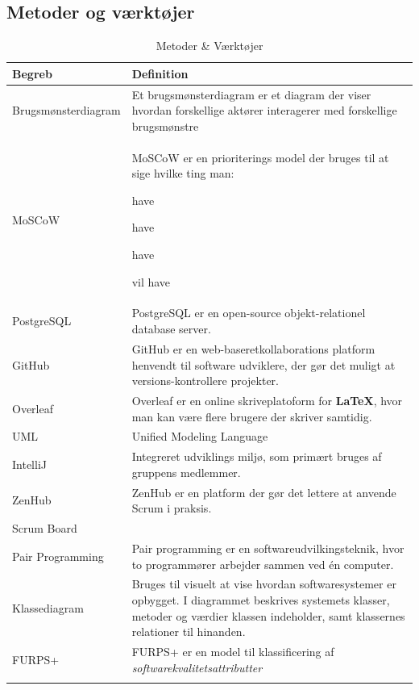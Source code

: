 \subsection{Metoder og værktøjer}
\begin{longtable}{|p{4cm}|p{12cm}|}
\hline
\textbf{Begreb} & \textbf{Definition} \\
\hline
Brugsmønsterdiagram & Et brugsmønsterdiagram er et diagram der viser hvordan forskellige aktører interagerer med forskellige brugsmønstre \\
\hline
MoSCoW & 
MoSCoW er en prioriterings model der bruges til at sige hvilke ting man: 
\begin{description}[noitemsep]
    \item [Skal] have
    \item [Burde] have 
    \item [Kan] have
    \item [Hvad man ikke] vil have
\end{description}  \\ 
\hline
PostgreSQL          &   PostgreSQL er en open-source objekt-relationel database server.\\
\hline
GitHub              &   GitHub er en web-baseretkollaborations platform henvendt til software udviklere, der gør det muligt at versions-kontrollere projekter.\\ 
\hline
Overleaf            &   Overleaf er en online skriveplatoform for \textbf{LaTeX}, hvor man kan være flere brugere der skriver samtidig. \\
\hline
UML                 &   Unified Modeling Language \\
\hline
IntelliJ            &   Integreret udviklings miljø, som primært bruges af gruppens medlemmer. \\
\hline
ZenHub              &   ZenHub er en platform der gør det lettere at anvende Scrum i praksis.  \\
\hline
Scrum Board         &   \\
\hline
Pair Programming    &   Pair programming er en softwareudvilkingsteknik, hvor to programmører arbejder sammen ved én computer.\\
\hline
Klassediagram       &   Bruges til visuelt at vise hvordan softwaresystemer er opbygget. I diagrammet beskrives systemets klasser, metoder og værdier klassen indeholder, samt klassernes relationer til hinanden.\\
\hline
FURPS+              &   FURPS+ er en model til klassificering af \textit{softwarekvalitetsattributter} %
\\
\hline
    \caption{Metoder \& Værktøjer}
    \label{tab:tools}
\end{longtable}

